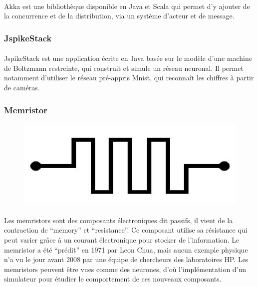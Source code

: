 \documentclass[a4paper,10pt]{article}
\begin{document}
\paragraph{}
Akka est une bibliothèque disponible en Java et Scala qui permet d’y ajouter de la concurrence et de la distribution, via un système d'acteur et de message.
        
\subsubsection{JspikeStack} 

\paragraph{}
JspikeStack est une application écrite en Java basée sur le modèle d'une machine de Boltzmann restreinte, qui construit et simule un réseau neuronal. Il permet notamment d’utiliser le réseau pré-appris Mnist, qui reconnaît les chiffres à partir de caméras.

\subsubsection{Memristor} 
\begin{figure}[h!]
\includegraphics[scale=0.12,right]{image/memristor.jpg}
\end{figure}
\paragraph{}
Les memristors sont des composants électroniques dit passifs, il vient de la contraction de “memory” et “resistance”. Ce composant utilise sa résistance qui peut varier grâce à un courant électronique pour stocker de l’information. Le memristor a été “prédit” en 1971 par Leon Chua, mais aucun exemple physique n’a vu le jour avant 2008 par une équipe de chercheurs des laboratoires HP. Les memristors peuvent être vues comme des neurones, d’où l’implémentation d’un simulateur pour étudier le comportement de ces nouveaux composants.
\end{document}
